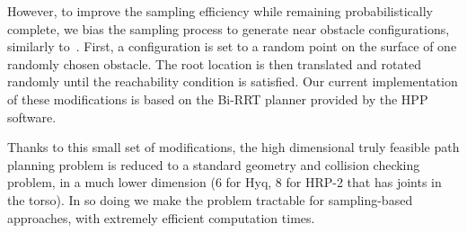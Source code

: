 However, to improve the sampling efficiency while remaining probabilistically complete, we bias the sampling process to generate near obstacle configurations, similarly to~\cite{Amato98choosinggood}.
First, a configuration is set to a random point on the surface of one randomly chosen obstacle. The root location is then translated and rotated randomly until the reachability condition is satisfied.
Our current implementation of these modifications is based on the Bi-RRT planner provided by the HPP software.

Thanks to this small set of modifications, the high dimensional truly feasible path planning problem is reduced to a standard geometry and collision checking problem, in a much lower dimension (6 for Hyq, 8 for HRP-2 that has joints in the torso). In so doing we make the problem tractable for sampling-based approaches, with extremely efficient computation times.
